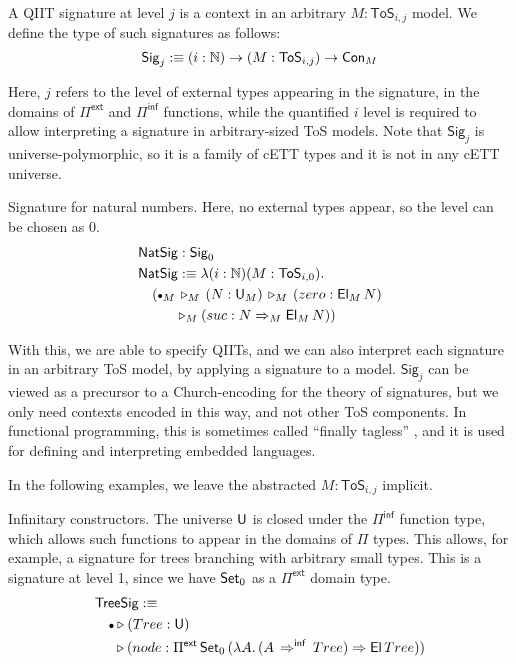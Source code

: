 \documentclass[sigplan,review,anonymous]{acmart}\settopmatter{printfolios=true,printccs=false,printacmref=false}
\newcommand{\ToS}{\mathsf{ToS}}
\newcommand{\ext}{\triangleright}
\newcommand{\emptycon}{\scaleobj{.75}\bullet}
\newcommand{\Pii}{\Pi}
\newcommand{\Pie}{\Pi^{\mathsf{ext}}}
\newcommand{\Piinf}{\Pi^{\mathsf{inf}}}
\newcommand{\Sig}{\mathsf{Sig}}
\newcommand{\NatSig}{\mathsf{NatSig}}
\newcommand{\arri}{\Rightarrow}
\newcommand{\arrinf}{\Rightarrow^{\mathsf{inf}}}
\begin{document}
\begin{definition}\label{def:signature}
A QIIT signature at level $j$ is a context in an arbitrary $M : \ToS_{i,j}$
model. We define the type of such signatures as follows:
\[
  \Sig_j :\equiv (i : \mathbb{N})\ra(M : \ToS_{i,j})\ra \Con_M
\]

Here, $j$ refers to the level of external types appearing in the signature, in
the domains of $\Pie$ and $\Piinf$ functions, while the quantified $i$ level is
required to allow interpreting a signature in arbitrary-sized ToS models. Note
that $\Sig_j$ is universe-polymorphic, so it is a family of cETT types and it is
not in any cETT universe.

\begin{example}{
    Signature for natural numbers. Here, no external types appear, so the level
    can be chosen as $0$.}
\begin{alignat*}{3}
  & \NatSig : \Sig_0 \\
  & \NatSig :\equiv \lambda (i :\mathbb{N})(M : \ToS_{i,0}).\\
  & \hspace{1em}(\emptycon_M\,\ext_M\, (N : \U_M) \,\ext_M\,(zero : \El_M\,N)\\
  & \hspace{2.67em}\ext_M (suc : N\arri_M\El_M\,N))
\end{alignat*}
\end{example}

With this, we are able to specify QIITs, and we can also interpret each
signature in an arbitrary ToS model, by applying a signature to a model.
$\Sig_j$ can be viewed as a precursor to a Church-encoding for the theory of
signatures, but we only need contexts encoded in this way, and not other ToS
components. In functional programming, this is sometimes called ``finally
tagless'' \cite{carette2007finally}, and it is used for defining and interpreting
embedded languages.
\end{definition}

In the following examples, we leave the abstracted $M : \ToS_{i,j}$ implicit.

\begin{example}{Infinitary constructors}. The universe $\mathsf{U}$ is closed under
the $\Piinf$ function type, which allows such functions to appear in the domains
of $\Pii$ types. This allows, for example, a signature for trees branching with
arbitrary small types. This is a signature at level 1, since we have $\mathsf{Set}_0$ as
a $\Pie$ domain type.
\begin{alignat*}{3}
& \mathsf{TreeSig} :\equiv \\
& \hspace{1em}\emptycon \ext (Tree : \U)\\
& \hspace{1.35em}\ext (node : \Pie\,\Set_0\,(\lambda A.\,(A\,\arrinf\,Tree)\arri\El\,Tree))
\end{alignat*}
\end{example}
\end{document}
